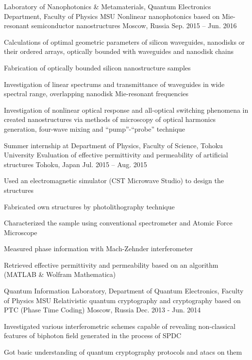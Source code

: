 \begin{cventries}
	\cventry
		{Laboratory of Nanophotonics \& Metamaterials, Quantum Electronics Department, Faculty of Physics MSU}
		{Nonlinear nanophotonics based on Mie-resonant semiconductor nanostructures}
		{Moscow, Russia}
		{Sep. 2015 -- Jun. 2016}
		{
			\begin{cvitems}
				\item {Calculations of optimal geometric parameters of silicon waveguides, nanodisks or their ordered arrays, optically bounded with waveguides and nanodisk chains }
				\item {Fabrication of optically bounded silicon nanostructure samples}
				\item {Investigation of linear spectrums and transmittance of waveguides in wide spectral range, overlapping nanodisk Mie-resonant frequencies }
				\item {Investigation of nonlinear optical response and all-optical switching phenomena in created nanostructures via methods of microscopy of optical harmonics generation, four-wave mixing and ``pump''-``probe'' technique}
			\end{cvitems}
		}

	\cventry
		{Summer internship at Department of Physics, Faculty of Science, Tohoku University}
		{Evaluation of effective permittivity and permeability of artificial structures}
		{Tohoku, Japan}
		{Jul. 2015 -- Aug. 2015}
		{
			\begin{cvitems}
				\item {Used an electromagnetic simulator (CST Microwave Studio) to design the structures}
				\item {Fabricated own structures by photolithography technique}
				\item {Characterized the sample using conventional spectrometer and Atomic Force Microscope}
				\item {Measured phase information with Mach-Zehnder interferometer}
				\item {Retrieved effective permittivity and permeability based on an algorithm (MATLAB \& Wolfram Mathematica)}
			\end{cvitems}
		}
	
	\cventry
		{
			Quantum Information Laboratory, Department of Quantum Electronics, Faculty of Physics MSU
		}
		{
			Relativistic quantum cryptography and cryptography based on PTC (Phase Time Coding)
		}
		{Moscow, Russia}
		{Dec. 2013 - Jun. 2014}
		{
			\begin{cvitems}
				\item {Investigated various interferometric schemes capable of revealing non-classical features of biphoton field generated in the process of SPDC}
				\item {Got basic understanding of quantum cryptography protocols and atacs on them}
			\end{cvitems}
		}
		
\end{cventries}
